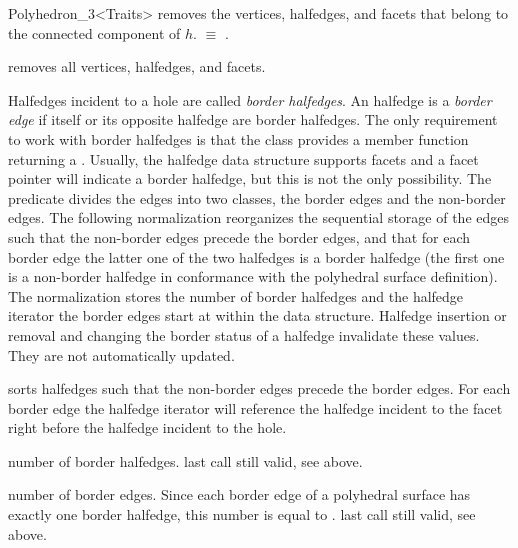 \begin{ccRefClass}{Polyhedron_3<Traits>}
    {removes the  vertices, halfedges, and facets that belong to the 
     connected component of $h$. 
       $\equiv$
     .}

    {removes all vertices, halfedges, and facets.}



\begin{ccAdvanced}
  
Halfedges incident to a hole are called {\em border halfedges}. An
halfedge is a {\em border edge\/} if itself or its opposite halfedge
are border halfedges. The only requirement to work with border
halfedges is that the  class provides a member function
 returning a . Usually, the halfedge data
structure supports facets and a  facet pointer will indicate
a border halfedge, but this is not the only possibility. The
 predicate divides the edges into two classes, the
border edges and the non-border edges. The following normalization
reorganizes the sequential storage of the edges such that the
non-border edges precede the border edges, and that for each border
edge the latter one of the two halfedges is a border halfedge (the
first one is a non-border halfedge in conformance with the polyhedral
surface definition). The normalization stores the number of border
halfedges and the halfedge iterator the border edges start at within
the data structure.  Halfedge insertion or removal and changing the
border status of a halfedge invalidate these values. They are not
automatically updated.


    {sorts halfedges such that the non-border edges precede the
     border edges. For each border edge the halfedge iterator will
    reference the halfedge incident to the facet right before the
    halfedge incident to the hole.} 

    {number of border halfedges.
    \ccPrecond last  call still valid, see above.}

    {number of border edges. Since each border edge of a polyhedral
    surface has exactly one border halfedge,
    this number is equal to .
    \ccPrecond last  call still valid, see above.}


\end{ccAdvanced}
\end{ccRefClass}
